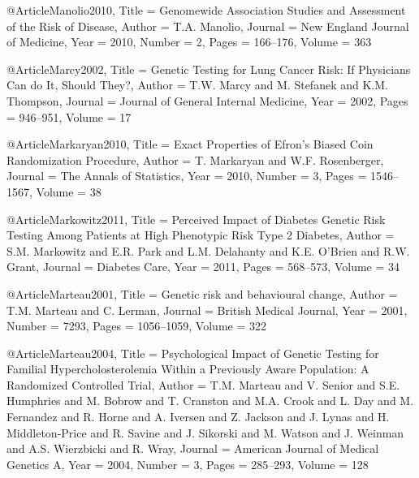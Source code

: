 @Article{Manolio2010,
  Title                    = {Genomewide Association Studies and Assessment of the Risk of Disease},
  Author                   = {T.A. Manolio},
  Journal                  = {New England Journal of Medicine},
  Year                     = {2010},
  Number                   = {2},
  Pages                    = {166--176},
  Volume                   = {363}
}

@Article{Marcy2002,
  Title                    = {Genetic Testing for Lung Cancer Risk: If Physicians Can do It, Should They?},
  Author                   = {T.W. Marcy and M. Stefanek and K.M. Thompson},
  Journal                  = {Journal of General Internal Medicine},
  Year                     = {2002},
  Pages                    = {946--951},
  Volume                   = {17}
}

@Article{Markaryan2010,
  Title                    = {Exact Properties of Efron's Biased Coin Randomization Procedure},
  Author                   = {T. Markaryan and W.F. Rosenberger},
  Journal                  = {The Annals of Statistics},
  Year                     = {2010},
  Number                   = {3},
  Pages                    = {1546--1567},
  Volume                   = {38}
}

@Article{Markowitz2011,
  Title                    = {Perceived Impact of Diabetes Genetic Risk Testing Among Patients at High Phenotypic Risk Type 2 Diabetes},
  Author                   = {S.M. Markowitz and E.R. Park and L.M. Delahanty and K.E. O'Brien and R.W. Grant},
  Journal                  = {Diabetes Care},
  Year                     = {2011},
  Pages                    = {568--573},
  Volume                   = {34}
}

@Article{Marteau2001,
  Title                    = {Genetic risk and behavioural change},
  Author                   = {T.M. Marteau and C. Lerman},
  Journal                  = {British Medical Journal},
  Year                     = {2001},
  Number                   = {7293},
  Pages                    = {1056--1059},
  Volume                   = {322}
}

@Article{Marteau2004,
  Title                    = {Psychological Impact of Genetic Testing for Familial Hypercholosterolemia Within a Previously Aware Population: A Randomized Controlled Trial},
  Author                   = {T.M. Marteau and V. Senior and S.E. Humphries and M. Bobrow and T. Cranston and M.A. Crook and L. Day and M. Fernandez and R. Horne and A. Iversen and Z. Jackson and J. Lynas and H. Middleton-Price and R. Savine and J. Sikorski and M. Watson and J. Weinman and A.S. Wierzbicki and R. Wray},
  Journal                  = {American Journal of Medical Genetics A},
  Year                     = {2004},
  Number                   = {3},
  Pages                    = {285--293},
  Volume                   = {128}
}

